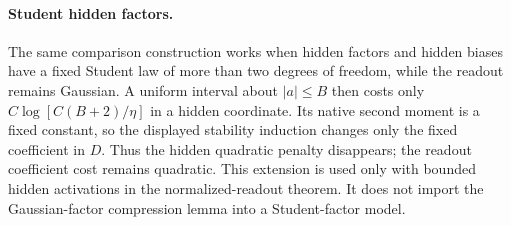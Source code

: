 \paragraph{Student hidden factors.}
The same comparison construction works when hidden factors and hidden
biases have a fixed Student law of more than two degrees of freedom,
while the readout remains Gaussian. A uniform interval about $|a|\le B$
then costs only $C\log[C(B+2)/\eta]$ in a hidden coordinate. Its native
second moment is a fixed constant, so the displayed stability induction
changes only the fixed coefficient in $D$. Thus the hidden quadratic
penalty disappears; the readout coefficient cost remains quadratic.
This extension is used only with bounded hidden activations in the
normalized-readout theorem. It does not import the Gaussian-factor
compression lemma into a Student-factor model.
